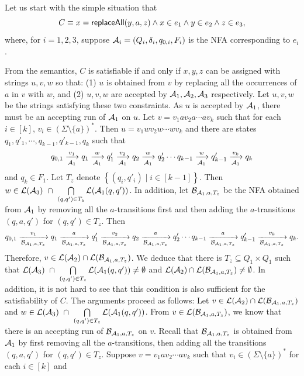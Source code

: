 Let us start with the simple situation that
\[C \equiv x = \mathsf{replaceAll}(y, a, z) \wedge x \in e_1 \wedge y \in e_2 \wedge z \in e_3,\]
where, for $i =1, 2, 3$, suppose  $\mathcal{A}_i = (Q_i, \delta_i, q_{0,i}, F_i)$
is the NFA corresponding to $e_i$.

From the semantics, $C$ is satisfiable if and only if $x, y, z$ can be assigned with strings $u, v, w$ so that: (1) $u$ is obtained from $v$ by replacing all the occurrences of $a$ in $v$ with $w$, and (2) $u, v, w$ are accepted by $\mathcal{A}_1, \mathcal{A}_2, \mathcal{A}_3$ respectively. Let $u,v,w$ be the strings satisfying these two constraints. As $u$ is accepted by $\mathcal{A}_1$,  there must be an accepting run of $\mathcal{A}_1$ on $u$. Let $v = v_1 a v_2 a \cdots a v_k$ such that for each $i \in [k]$, $v_i \in (\Sigma \setminus \{a\})^*$. Then $u = v_1 w v_2 w \cdots w v_k$ and there are states $q_1, q'_1, \cdots, q_{k-1}, q'_{k-1}, q_k$  such that
%
$$
q_{0,1} \xrightarrow[\mathcal{A}_1]{v_1} q_1 \xrightarrow[\mathcal{A}_1]{w} q'_1 \xrightarrow[\mathcal{A}_1]{v_2} q_2 \xrightarrow[\mathcal{A}_1]{w} q'_2 \cdots q_{k-1} \xrightarrow[\mathcal{A}_1]{w} q'_{k-1} \xrightarrow[\mathcal{A}_1]{v_k} q_k
$$
%
 and $q_k \in F_{1}$. Let $T_z$ denote $\left\{(q_i, q'_i) \mid i \in [k-1] \right\}$. Then $w \in \mathcal{L}(\mathcal{A}_3)\ \cap\ \bigcap \limits_{(q, q') \in T_z} \mathcal{L}(\mathcal{A}_1(q, q'))$. In addition, let  $\mathcal{B}_{\mathcal{A}_1,a,T_z}$ be the NFA obtained from $\mathcal{A}_1$ by removing all the $a$-transitions first and then adding the $a$-transitions $(q, a, q')$ for $(q, q') \in T_z$. Then
$$
q_{0,1} \xrightarrow[\mathcal{B}_{\mathcal{A}_1,a,T_z}]{v_1} q_1 \xrightarrow[\mathcal{B}_{\mathcal{A}_1,a,T_z}]{a} q'_1 \xrightarrow[\mathcal{B}_{\mathcal{A}_1,a,T_z}]{v_2} q_2 \xrightarrow[\mathcal{B}_{\mathcal{A}_1,a,T_z}]{a} q'_2 \cdots q_{k-1} \xrightarrow[\mathcal{B}_{\mathcal{A}_1,a,T_z}]{a} q'_{k-1} \xrightarrow[\mathcal{B}_{\mathcal{A}_1,a,T_z}]{v_k} q_k.
$$
%
Therefore,
$v \in \mathcal{L}(\mathcal{A}_2) \cap \mathcal{L}(\mathcal{B}_{\mathcal{A}_1,a,T_z})$. We deduce that there is $T_z \subseteq Q_1 \times Q_1$ such that $\mathcal{L}(\mathcal{A}_3)\ \cap\ \bigcap \limits_{(q, q') \in T_z} \mathcal{L}(\mathcal{A}_1(q, q')) \neq \emptyset$ and $ \mathcal{L}(\mathcal{A}_2) \cap \mathcal{L}(\mathcal{B}_{\mathcal{A}_1,a,T_z}) \neq \emptyset$. In addition, it is not hard to see that this condition is also sufficient for the satisfiability of $C$. The arguments proceed as follows: Let $v \in  \mathcal{L}(\mathcal{A}_2) \cap \mathcal{L}(\mathcal{B}_{\mathcal{A}_1,a,T_z})$ and $w \in \mathcal{L}(\mathcal{A}_3)\ \cap\ \bigcap \limits_{(q, q') \in T_z} \mathcal{L}(\mathcal{A}_1(q, q'))$. From $v \in \mathcal{L}(\mathcal{B}_{\mathcal{A}_1,a,T_z})$, we know that there is an accepting run of $\mathcal{B}_{\mathcal{A}_1,a,T_z}$ on $v$. Recall that $\mathcal{B}_{\mathcal{A}_1,a,T_z}$ is obtained from $\mathcal{A}_1$ by first removing all the $a$-transitions, then adding all the transitions $(q,a,q')$ for $(q,q') \in T_z$.  Suppose $v = v_1 a v_2 \cdots a v_k$ such that $v_i \in (\Sigma \setminus \{a\})^*$ for each $i \in [k]$ and
